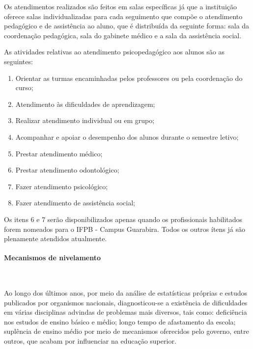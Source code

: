 
       Os atendimentos realizados são feitos em salas específicas já que a instituição oferece salas individualizadas para cada seguimento que compõe o atendimento pedagógico e de assistência ao aluno, que é distribuída da seguinte forma: sala da coordenação pedagógica, sala do gabinete médico e a sala da assistência social. 

       As atividades relativas ao atendimento psicopedagógico aos alunos são as seguintes:

\begin{enumerate}
	\item Orientar as turmas encaminhadas pelos professores ou pela coordenação do curso; 
	\item Atendimento às dificuldades de aprendizagem;
	\item Realizar atendimento individual ou em grupo;
	\item Acompanhar e apoiar o desempenho dos alunos durante o semestre letivo;
	\item Prestar atendimento médico;
	\item Prestar atendimento odontológico;
	\item Fazer atendimento psicológico;
	\item Fazer atendimento de assistência social;
\end{enumerate}

	Os itens 6 e 7 ser\~ao disponibilizados apenas quando os profissionais habilitados forem nomeados para o IFPB - Campus Guarabira. Todos os outros \'itens j\'a s\~ao plenamente atendidos atualmente.

\paragraph{Mecanismos de nivelamento}\

	Ao longo dos últimos anos, por meio da análise de estatísticas próprias e estudos publicados por organismos nacionais, diagnosticou-se a existência de dificuldades em várias disciplinas advindas de problemas mais diversos, tais como: deficiência nos estudos de ensino básico e médio; longo tempo de afastamento da escola; suplência de ensino médio por meio de mecanismos oferecidos pelo governo, entre outros, que acabam por influenciar na educação superior.

